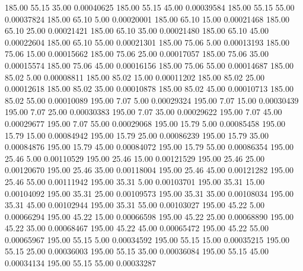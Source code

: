     185.00     55.15     35.00     0.00040625
    185.00     55.15     45.00     0.00039584
    185.00     55.15     55.00     0.00037824
    185.00     65.10      5.00     0.00020001
    185.00     65.10     15.00     0.00021468
    185.00     65.10     25.00     0.00021421
    185.00     65.10     35.00     0.00021480
    185.00     65.10     45.00     0.00022604
    185.00     65.10     55.00     0.00021301
    185.00     75.06      5.00     0.00013193
    185.00     75.06     15.00     0.00015662
    185.00     75.06     25.00     0.00017057
    185.00     75.06     35.00     0.00015574
    185.00     75.06     45.00     0.00016156
    185.00     75.06     55.00     0.00014687
    185.00     85.02      5.00     0.00008811
    185.00     85.02     15.00     0.00011202
    185.00     85.02     25.00     0.00012618
    185.00     85.02     35.00     0.00010878
    185.00     85.02     45.00     0.00010713
    185.00     85.02     55.00     0.00010089
    195.00      7.07      5.00     0.00029324
    195.00      7.07     15.00     0.00030439
    195.00      7.07     25.00     0.00030383
    195.00      7.07     35.00     0.00029622
    195.00      7.07     45.00     0.00029677
    195.00      7.07     55.00     0.00029068
    195.00     15.79      5.00     0.00085458
    195.00     15.79     15.00     0.00084942
    195.00     15.79     25.00     0.00086239
    195.00     15.79     35.00     0.00084876
    195.00     15.79     45.00     0.00084072
    195.00     15.79     55.00     0.00086354
    195.00     25.46      5.00     0.00110529
    195.00     25.46     15.00     0.00121529
    195.00     25.46     25.00     0.00120670
    195.00     25.46     35.00     0.00118004
    195.00     25.46     45.00     0.00121282
    195.00     25.46     55.00     0.00111942
    195.00     35.31      5.00     0.00103701
    195.00     35.31     15.00     0.00104092
    195.00     35.31     25.00     0.00109573
    195.00     35.31     35.00     0.00108034
    195.00     35.31     45.00     0.00102944
    195.00     35.31     55.00     0.00103027
    195.00     45.22      5.00     0.00066294
    195.00     45.22     15.00     0.00066598
    195.00     45.22     25.00     0.00068890
    195.00     45.22     35.00     0.00068467
    195.00     45.22     45.00     0.00065472
    195.00     45.22     55.00     0.00065967
    195.00     55.15      5.00     0.00034592
    195.00     55.15     15.00     0.00035215
    195.00     55.15     25.00     0.00036003
    195.00     55.15     35.00     0.00036084
    195.00     55.15     45.00     0.00034134
    195.00     55.15     55.00     0.00033287
